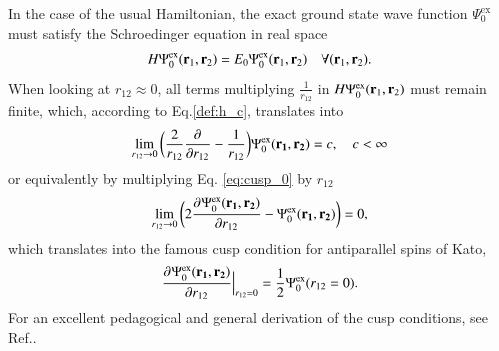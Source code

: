 \documentclass[aip,jcp,reprint,noshowkeys,superscriptaddress]{revtex4-1}
\newcommand{\deriv}[3]{\frac{\partial^{#3} #1}{\partial {#2}^{#3}}}
\newcommand{\bd}[1]{{\bf {#1}}}
\newcommand{\br}[0]{{\bf {r}}}
\newcommand{\psiex}[0]{\Psi^{\text{ex}}_0}
\begin{document}
In the case of the usual Hamiltonian, the exact ground state wave function $\psiex$ must satisfy the Schroedinger equation in real space 
\begin{equation}
 H \psiex(\br{}_1,\br{}_2) = E_0 \psiex(\br{}_1,\br{}_2)\quad \forall (\br{}_1,\br{}_2).
\end{equation}
When looking at $r_{12}\approx 0$, all terms multiplying $\frac{1}{r_{12}}$ in $H \psiex(\br{}_1,\br{}_2)$ must remain finite, which, according to Eq.\eqref{def:h_c}, translates into
\begin{equation}
 \label{eq:cusp_0}
 \lim_{r_{12}\rightarrow 0}\bigg( \frac{2}{r_{12}} \deriv{}{r_{12}}{} -\frac{1}{r_{12}}\bigg) \psiex(\bd{r_1},\bd{r_2})  = c,\quad c<\infty 
\end{equation}
or equivalently by multiplying Eq. \eqref{eq:cusp_0} by $r_{12}$
\begin{equation}
 \lim_{r_{12}\rightarrow 0}\bigg( 2 \deriv{\psiex(\bd{r_1},\bd{r_2})}{r_{12}}{} -\psiex(\bd{r_1},\bd{r_2}) \bigg) = 0, 
\end{equation}
which translates into the famous cusp condition for antiparallel spins of Kato\cite{Kat-CPAM-57}, 
\begin{equation}
 \deriv{\psiex(\bd{r_1},\bd{r_2})}{r_{12}}{}\Bigr|_{r_{12}=0} = \frac{1}{2} \psiex(r_{12}=0). 
\end{equation} 
For an excellent pedagogical and general derivation of the cusp conditions, see Ref.. 
\end{document}
